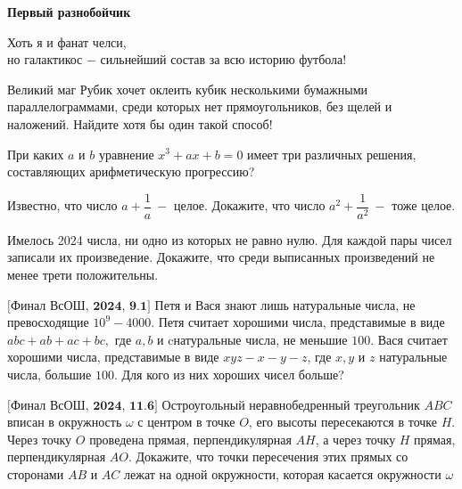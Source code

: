 \centerline{\Huge \bf  Первый разнобойчик}

\begin{flushright}
    \scriptsize{Хоть я и фанат челси, \\
                но галактикос $-$ сильнейший состав за всю историю футбола!}
\end{flushright}


Великий маг Рубик хочет оклеить кубик несколькими бумажными параллелограммами, среди которых нет прямоугольников, без щелей и наложений. Найдите хотя бы один такой способ!

При каких $a$ и $b$ уравнение $ x^3 + ax + b = 0 $ имеет три различных решения, составляющих арифметическую прогрессию?

Известно, что число  $a + \dfrac{1}{a} \ -$ целое. Докажите, что число  $a^2 + \dfrac{1}{a^2} \ -$ тоже целое. 

Имелось 2024 числа, ни одно из которых не равно нулю. Для каждой пары чисел записали их произведение. Докажите, что среди выписанных произведений не менее трети положительны.

$\bigl[\textbf{Финал ВсОШ, 2024, 9.1}\bigr]$
Петя и Вася знают лишь натуральные числа, не превосходящие
$10^9 - 4000$. Петя считает хорошими числа, представимые в виде $abc + ab + ac + bc,$ где $a, b$ и cнатуральные числа, не меньшие $100.$ Вася считает хорошими числа, представимые в виде $xyz - x - y - z$, где $x, y$ и $z$ натуральные числа, большие $100.$ Для кого из них хороших чисел больше?

$\bigl[\textbf{Финал ВсОШ, 2024, 11.6}\bigr]$
Остроугольный неравнобедренный треугольник $ABC$ вписан в окружность $\omega$ с центром в точке $O$, его высоты пересекаются в точке $H$. Через точку $O$ проведена прямая, перпендикулярная $AH$, а через точку $H$ прямая, перпендикулярная $AO$. Докажите, что точки пересечения этих прямых со сторонами $AB$ и $AC$ лежат на одной окружности, которая касается окружности $\omega$
